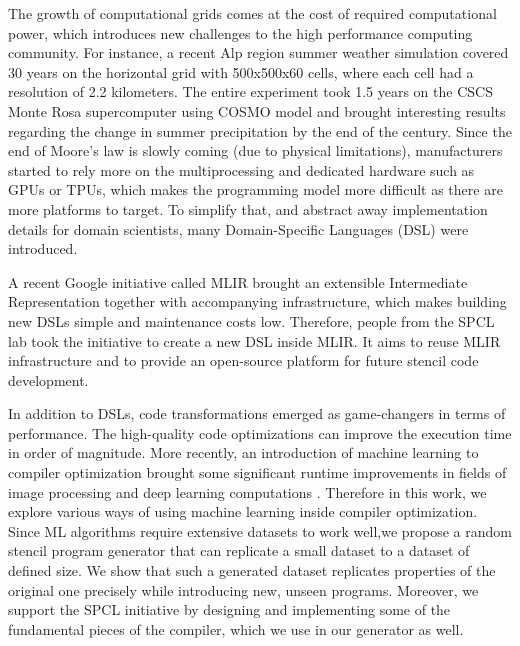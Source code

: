 \documentclass[sigplan,\review anonymous]{acmart}
\begin{document}
The growth of computational grids comes at the cost of required computational
power, which introduces new challenges to the high performance computing
community. For instance, a recent Alp region summer weather simulation
\cite{doi:10.1002/2014GL062588} covered 30 years on the horizontal grid with
500x500x60 cells, where each cell had a resolution of 2.2 kilometers. The
entire experiment took 1.5 years on the CSCS Monte Rosa supercomputer using
COSMO model \cite{cosmo} and brought interesting results regarding the change
in summer precipitation by the end of the century. Since the end of Moore's
law \cite{moore} is slowly coming (due to physical limitations), manufacturers
started to rely more on the multiprocessing and dedicated hardware such as GPUs
or TPUs, which makes the programming model more difficult as there are more
platforms to target. To simplify that, and abstract away implementation details
for domain scientists, many Domain-Specific Languages (DSL) were introduced.

A recent Google initiative called MLIR \cite{lattner2020mlir} brought an
extensible Intermediate Representation together with accompanying
infrastructure, which makes building new DSLs simple and maintenance costs low.
Therefore, people from the SPCL lab took the initiative to create a new DSL
inside MLIR. It aims to reuse MLIR infrastructure and to provide an open-source
platform for future stencil code development.

In addition to DSLs, code transformations emerged as game-changers
in terms of performance. The high-quality code optimizations can improve the
execution time in order of magnitude. More recently, an introduction of machine
learning to compiler optimization brought some significant runtime improvements
in fields of image processing \cite{halide_ml} and deep learning computations
\cite{autotvm}. Therefore in this work, we explore various ways of using machine
learning
inside compiler optimization. Since ML algorithms require extensive datasets
to work well,we propose a random stencil program generator that can replicate
a small dataset to a dataset of defined size. We show that such a generated
dataset replicates properties of the original one precisely while introducing
new, unseen programs. Moreover, we support the SPCL initiative by designing
and implementing some of the fundamental pieces of the compiler, which we use
in our generator as well.
\end{document}
